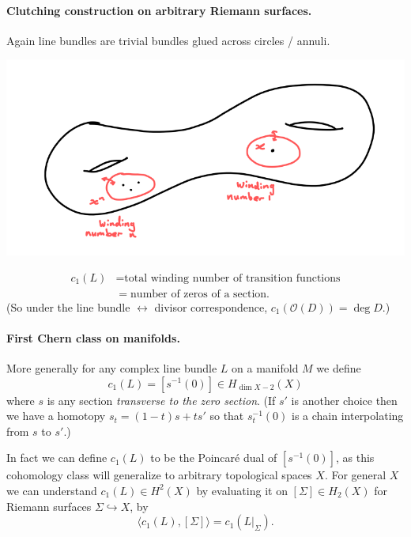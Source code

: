 \documentclass{article}
\theoremstyle{definition}
\renewcommand{\O}{\mathcal{O}}
\begin{document}
\paragraph{Clutching construction on arbitrary Riemann surfaces.}
Again line bundles are trivial bundles glued across circles / annuli.
\begin{center}
    \includegraphics[scale=0.6]{chern_clutch}
\end{center}
\begin{align*}
    c_1(L)
        &= \text{total winding number of transition functions} \\
        &= \text{number of zeros of a section}.
\end{align*}
(So under the line bundle $\leftrightarrow$ divisor correspondence,
$c_1(\O(D))=\deg D$.)

\paragraph{First Chern class on manifolds.}
More generally for any complex line bundle $L$ on a manifold $M$ we define
\begin{equation*}
    c_1(L) = [s^{-1}(0)]\in H_{\dim X-2}(X)
\end{equation*}
where $s$ is any section \emph{transverse to the zero section}. (If $s'$ is
another choice then we have a homotopy $s_t=(1-t)s+ts'$ so that $s_t^{-1}(0)$ is
a chain interpolating from $s$ to $s'$.)

In fact we can define $c_1(L)$ to be the Poincar\'e dual of $[s^{-1}(0)]$, as
this cohomology class will generalize to arbitrary topological spaces $X$. For
general $X$ we can understand $c_1(L)\in H^2(X)$ by evaluating it on
$[\Sigma]\in H_2(X)$ for Riemann surfaces $\Sigma\hookrightarrow X$, by
\begin{equation*}
    \langle c_1(L),[\Sigma]\rangle = c_1(L|_\Sigma).
\end{equation*}
\end{document}
